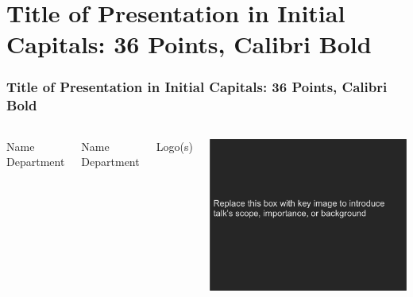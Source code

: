 \documentclass{beamer}
\begin{document}
\begin{frame}
\titlepage
\end{frame}

\section{Title of Presentation in Initial Capitals: 36 Points, Calibri Bold}

\begin{frame}
\frametitle{Title of Presentation in Initial Capitals: 36 Points, Calibri Bold}


\begin{columns}
Name \\
Department



\vspace{3mm}




\vspace{3mm}



Name \\
Department



\vspace{3mm}




\vspace{3mm}



Logo(s)

\centerline{\includegraphics[width=0.9\linewidth]{fig-talk/title_image.png}}




\end{columns}
\end{frame}
\end{document}
